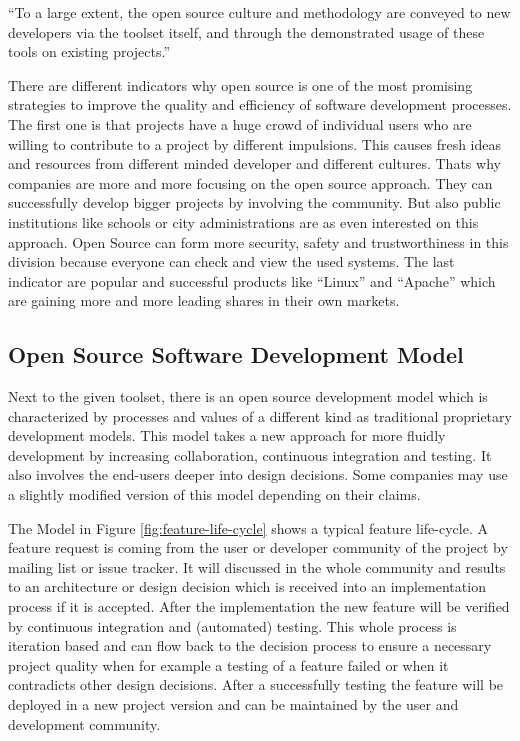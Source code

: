 \documentclass[DIV=calc,paper=a4,fontsize=9pt,twocolumn]{scrartcl}
\begin{document}
\enquote{To a large extent, the open source culture and methodology are conveyed to new developers via the toolset itself, and through the demonstrated usage of these tools on existing projects.} \citep{Robbins02adoptingoss}

There are different indicators why open source is one of the most promising strategies to improve the quality and efficiency of software development processes. The first one is that projects have a huge crowd of individual users who are willing to contribute to a project by different impulsions. This causes fresh ideas and resources from different minded developer and different cultures. Thats why companies are more and more focusing on the open source approach. They can successfully develop bigger projects by involving the community. But also public institutions like schools or city administrations are as even interested on this approach. Open Source can form more security, safety and trustworthiness in this division because everyone can check and view the used systems. The last indicator are popular and successful products like \enquote{Linux} and \enquote{Apache} which are gaining more and more leading shares in their own markets. \citep{fuggetta2003open}

\subsection{Open Source Software Development Model}

Next to the given toolset, there is an open source development model which is characterized by processes and values of a different kind as traditional proprietary development models. This model takes a new approach for more fluidly development by increasing collaboration, continuous integration and testing. It also involves the end-users deeper into design decisions. Some companies may use a slightly modified version of this model depending on their claims. \citep{Haddad11}

The Model in Figure \ref{fig:feature-life-cycle} shows a typical feature life-cycle. A feature request is coming from the user or developer community of the project by mailing list or issue tracker. It will discussed in the whole community and results to an architecture or design decision which is received into an implementation process if it is accepted. After the implementation the new feature will be verified by continuous integration and (automated) testing. This whole process is iteration based and can flow back to the decision process to ensure a necessary project quality when for example a testing of a feature failed or when it contradicts other design decisions. After a successfully testing the feature will be deployed in a new project version and can be maintained by the user and development community. \citep{Haddad11}
\end{document}
